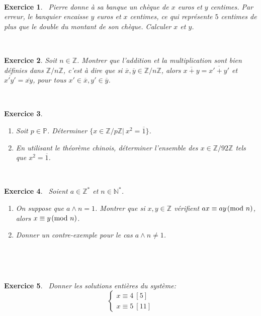 \documentclass[11pt,a4paper]{article}
\newtheorem{ex}{Exercice}
\newcommand{\Z}{\mathbb{Z}}
\begin{document}
\
\

\begin{ex}\label{banque}\
Pierre donne à sa banque un chèque de $x$ euros et $y$ centimes. Par erreur, le banquier encaisse $y$ euros et $x$ centimes, ce qui représente $5$ centimes de plus que le double du montant de son chèque. Calculer $x$ et $y$.
\end{ex}

\

\begin{ex}
Soit $n\in \Z$. Montrer que l'addition et la multiplication sont bien définies dans $\Z/n\Z$, c'est  à dire que si $\overline{x},\overline{y}\in \Z/n\Z$, alors $\overline{x+y}=\overline{x'+y'}$ et $\overline{x'y'}=\overline{xy}$, pour tous $x'\in \overline{x}, y'\in \overline{y}$. 
\end{ex}

\

\begin{ex}\label{Carrés_modulo_n}
\begin{enumerate}
\item Soit $p\in \mathbb{P}$. Déterminer $\{x\in \Z/p\Z|\ x^2=\overline{1}\}$.

\item En utilisant le théorème chinois, déterminer l'ensemble des $x\in \Z/92\Z$ tels que $x^2=\overline{1}$.
\end{enumerate}


\end{ex}


\

\begin{ex}\label{division_Z_nZ}\
Soient $a \in \mathbb{Z}^*$ et $n \in \mathbb{N}^* $. \begin{enumerate}
\item On suppose que $a\wedge n=1$. Montrer que si $x,y\in \Z$ vérifient  $ ax \equiv ay \! \! \pmod {n}  $, alors $ x \equiv y \! \! \pmod {n}$.

\item Donner un contre-exemple pour le cas $a\wedge n\neq 1 $.
\end{enumerate} 
\end{ex}

\


\

\begin{ex}\label{systeme_equations_modulaires}\
Donner les solutions entières du système:
$$ \left \{ \begin{array}{l}
{x}\equiv {4} \ [{5}] \\
{x} \equiv {5} \ [{11}]
\end{array} \right.   $$
\end{ex}
\end{document}
